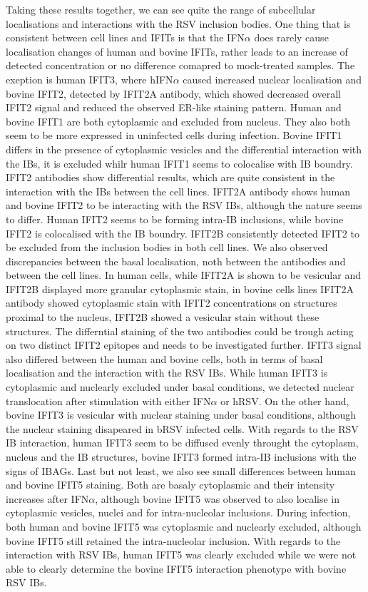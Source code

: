 Taking these results together, we can see quite the range of subcellular localisations and interactions with the RSV inclusion bodies. One thing that is consistent between cell lines and IFITs is that the IFN\(\alpha\) does rarely cause localisation changes of human and bovine IFITs, rather leads to an increase of detected concentration or no difference comapred to mock-treated samples. The exeption is human IFIT3, where hIFN\(\alpha\) caused increased nuclear localisation and bovine IFIT2, detected by IFIT2A antibody, which showed decreased overall IFIT2 signal and reduced the observed ER-like staining pattern. Human and bovine IFIT1 are both cytoplasmic and excluded from nucleus. They also both seem to be more expressed in uninfected cells during infection. Bovine IFIT1 differs in the presence of cytoplasmic vesicles and the differential interaction with the IBs, it is excluded whilr human IFIT1 seems to colocalise with IB boundry. IFIT2 antibodies show differential results, which are quite consistent in the interaction with the IBs between the cell lines. IFIT2A antibody shows human and bovine IFIT2 to be interacting with the RSV IBs, although the nature seems to differ. Human IFIT2 seems to be forming intra-IB inclusions, while bovine IFIT2 is colocalised with the IB boundry. IFIT2B consistently detected IFIT2 to be excluded from the inclusion bodies in both cell lines. We also observed discrepancies between the basal localisation, noth between the antibodies and between the cell lines. In human cells, while IFIT2A is shown to be vesicular and IFIT2B displayed more granular cytoplasmic stain, in bovine cells lines IFIT2A antibody showed cytoplasmic stain with IFIT2 concentrations on structures proximal to the nucleus, IFIT2B showed a vesicular stain without these structures. The differntial staining of the two antibodies could be trough acting on two distinct IFIT2 epitopes and needs to be investigated further. IFIT3 signal also differed between the human and bovine cells, both in terms of basal localisation and the interaction with the RSV IBs. While human IFIT3 is cytoplasmic and nuclearly excluded under basal conditions, we detected nuclear translocation after stimulation with either IFN\(\alpha\) or hRSV. On the other hand, bovine IFIT3 is vesicular with nuclear staining under basal conditions, although the nuclear staining disapeared in bRSV infected cells. With regards to the RSV IB interaction, human IFIT3 seem to be diffused evenly throught the cytoplasm, nucleus and the IB structures, bovine IFIT3 formed intra-IB inclusions with the signs of IBAGs. Last but not least, we also see small differences between human and bovine IFIT5 staining. Both are basaly cytoplasmic and their intensity increases after IFN\(\alpha\), although bovine IFIT5 was observed to also localise in cytoplasmic vesicles, nuclei and for intra-nucleolar inclusions. During infection, both human and bovine IFIT5 was cytoplasmic and nuclearly excluded, although bovine IFIT5 still retained the intra-nucleolar inclusion. With regards to the interaction with RSV IBs, human IFIT5 was clearly excluded while we were not able to clearly determine the bovine IFIT5 interaction phenotype with bovine RSV IBs. 

